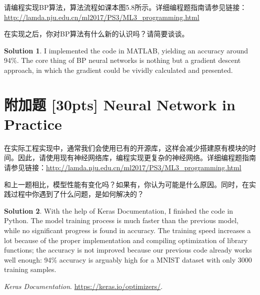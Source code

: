 \documentclass[a4paper,UTF8]{article}
\numberwithin{equation}{section}
\theoremstyle{definition}
\newtheorem*{solution}{Solution}
\begin{document}
请编程实现BP算法，算法流程如课本图5.8所示。详细编程题指南请参见链接：\url{http://lamda.nju.edu.cn/ml2017/PS3/ML3_programming.html}

在实现之后，你对BP算法有什么新的认识吗？请简要谈谈。
\begin{solution}
I implemented the code in MATLAB, yielding an accuracy around 94\%. The core thing of BP neural networks is nothing but a gradient descent approach, in which the gradient could be vividly calculated and presented.
\end{solution}

\section*{附加题   [30pts] Neural Network in Practice}
在实际工程实现中，通常我们会使用已有的开源库，这样会减少搭建原有模块的时间。因此，请使用现有神经网络库，编程实现更复杂的神经网络。详细编程题指南请参见链接：\url{http://lamda.nju.edu.cn/ml2017/PS3/ML3_programming.html}

和上一题相比，模型性能有变化吗？如果有，你认为可能是什么原因。同时，在实践过程中你遇到了什么问题，是如何解决的？
\begin{solution}
With the help of Keras Documentation\cite{ref: doc}, I finished the code in Python. The model training process is much faster than the previous model, while no significant progress is found in accuracy. The training speed increases a lot because of the proper implementation and compiling optimization of library functions; the accuracy is not improved because our previous code already works well enough: 94\% accuracy is arguably high for a MNIST dataset with only 3000 training samples.
~\\
\end{solution}

\begin{thebibliography}{99}
\textit{Keras Documentation}. \url{https://keras.io/optimizers/}.
\end{thebibliography}
\end{document}
